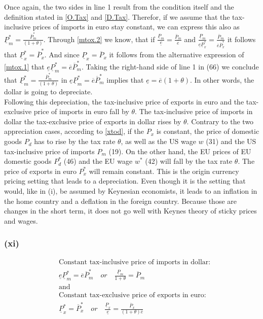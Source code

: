 Once again, the two sides in line 1 result from the condition itself and the definition stated in \eqref{O.Tax} and \eqref{D.Tax}. Therefor, if we assume that the tax-inclusive prices of imports in euro stay constant, we can express this also as $\underline P^*_m  = \frac{\overline P^*_m}{(1+\theta)}$. Through \eqref{mtox.2} we know, that if $\frac{\underline P_m}{\underline e} = \frac{\overline P_m}{\overline e}$ and $\frac{\underline P_m}{\underline e \underline P_x^*} = \frac{\overline P_m}{\overline e \overline P_x^*}$ it follows that $\underline P^*_x = \overline P^*_x$. And since $\underline P_x = \overline P_x$ it follows from the alternative expression of \eqref{mtox.1} that $\underline e \underline P^*_m = \overline e \overline P_m^*$. Taking the right-hand side of line 1 in (66) we conclude that $\underline P^*_m  = \frac{\overline P^*_m}{(1+\theta)}$ in $\underline e \underline P^*_m = \overline e \overline P_m^*$ implies that $\underline e = \overline e (1+\theta)$. In other words, the dollar is going to depreciate. \\
Following this depreciation, the tax-inclusive price of exports in euro and the tax-exclusive price of imports in euro fall by $\theta$. The tax-inclusive price of imports in dollar the tax-exclusive price of exports in dollar rises by $\theta$.
Contrary to the two appreciation cases, according to \eqref{xtod}, if the $P_x$ is constant, the price of domestic goods $P_d$ has to rise by the tax rate $\theta$, as well as the US wage $w$ (31) and the US tax-inclusive price of imports $P_m$ (19). On the other hand, the EU prices of EU domestic goods $P^*_d$ (46) and the EU wage $w^*$ (42) will fall by the tax rate $\theta$. The price of exports in euro $P^*_x$ will remain constant. 
This is the origin currency pricing setting that leads to a depreciation. Even though it is the setting that would, like in (i), be assumed by Keynesian economists, it leads to an inflation in the home country and a deflation in the foreign country. Because those are changes in the short term, it does not go well with Keynes theory of sticky prices and wages. 

\subsubsection*{(xi)}
\begin{equation}\label{xi}
\begin{aligned}
&\text{Constant tax-inclusive price of imports in dollar:}\\ &\underline e \underline P^*_m = \overline e \overline P^*_m \quad or \quad \frac{\underline P_m}{1+\theta} = \overline P_m \\
&\text{and}\\
&\text{Constant tax-exclusive price of exports in euro:}\\ &\underline P^*_x = \overline P^*_x \quad or \quad \frac{\underline P_x}{\underline e} = \frac{\overline P_x}{(1+\theta)\overline e}
\end{aligned}
\end{equation}

